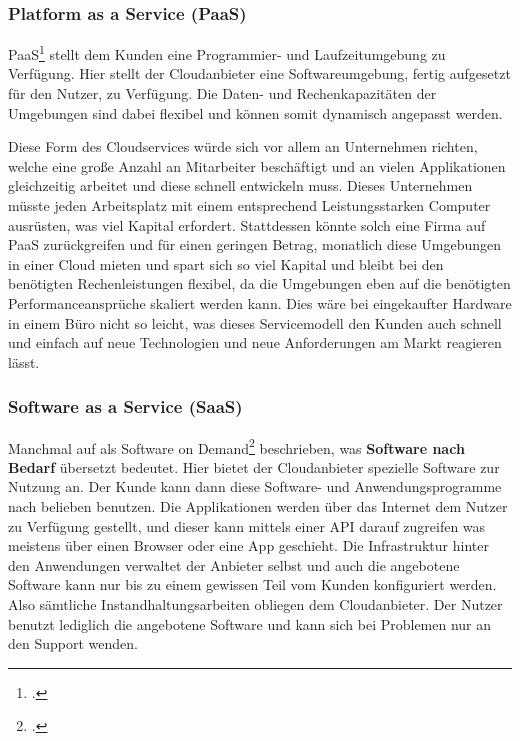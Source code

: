 \subsubsection{Platform as a Service (PaaS)}
PaaS\footcite{cloud-ms} stellt dem Kunden eine Programmier- und Laufzeitumgebung zu Verfügung. Hier stellt der Cloudanbieter eine Softwareumgebung, fertig
aufgesetzt für den Nutzer, zu Verfügung. Die Daten- und Rechenkapazitäten
der Umgebungen sind dabei flexibel und können somit dynamisch angepasst werden.

Diese Form des Cloudservices würde sich vor allem an Unternehmen richten, welche eine große Anzahl an Mitarbeiter beschäftigt und an vielen Applikationen gleichzeitig arbeitet und diese schnell entwickeln muss. 
Dieses Unternehmen müsste jeden Arbeitsplatz mit einem entsprechend Leistungsstarken Computer ausrüsten, was viel Kapital erfordert. Stattdessen könnte solch eine Firma auf PaaS zurückgreifen und für einen geringen Betrag, monatlich diese Umgebungen in einer Cloud mieten und spart sich so viel Kapital und bleibt bei den benötigten
Rechenleistungen flexibel, da die Umgebungen eben auf die benötigten Performanceansprüche skaliert werden kann. Dies wäre bei eingekaufter Hardware in einem Büro nicht so leicht, was dieses Servicemodell den Kunden auch schnell und einfach auf neue Technologien und neue Anforderungen am Markt reagieren lässt.


\subsubsection{Software as a Service (SaaS)}
Manchmal auf als Software on Demand\footcite{cloud-computing} beschrieben, was \textbf{Software nach Bedarf} übersetzt bedeutet. Hier bietet der Cloudanbieter spezielle Software zur Nutzung an. Der Kunde kann dann diese Software- und Anwendungsprogramme nach belieben benutzen. Die Applikationen werden über das Internet dem Nutzer zu Verfügung gestellt, 
und dieser kann mittels einer API darauf zugreifen was meistens über einen Browser oder eine App geschieht. Die Infrastruktur hinter den Anwendungen verwaltet der Anbieter selbst und auch die angebotene Software kann nur bis zu einem gewissen Teil vom Kunden konfiguriert werden. Also sämtliche Instandhaltungsarbeiten obliegen dem Cloudanbieter. Der Nutzer benutzt lediglich die angebotene Software und kann sich bei Problemen nur an den Support wenden.

